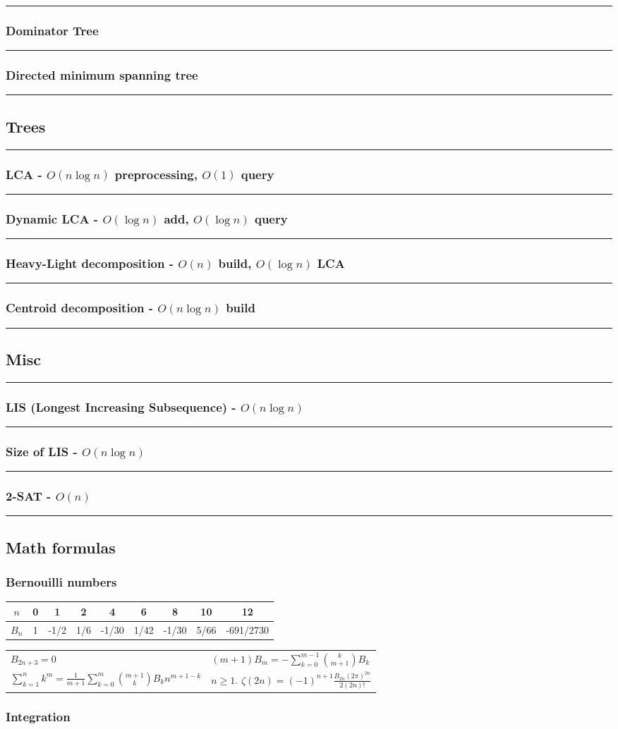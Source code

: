 \documentclass[landscape,a4paper,twocolumn,10pt]{report}
\renewcommand{\line}{\noindent\rule{\linewidth}{1pt}}
\newcommand{\algosection}[1]{\line \subsection*{#1}}
\newcommand{\algorithm}[1]{\line \subsubsection*{#1}}
\begin{document}
\algorithm{Dominator Tree}


\algorithm{Directed minimum spanning tree}


\algosection{Trees}
\label{trees}

\algorithm{LCA - $O(n \log n)$ preprocessing, $O(1)$ query}


\algorithm{Dynamic LCA - $O(\log n)$ add, $O(\log n)$ query}


\algorithm{Heavy-Light decomposition - $O(n)$ build, $O(\log n)$ LCA}


\algorithm{Centroid decomposition - $O(n \log n)$ build}



\algosection{Misc}
\label{misc}

\algorithm{LIS (Longest Increasing Subsequence) - $O(n \log n)$}


\algorithm{Size of LIS - $O(n \log n)$}


\algorithm{2-SAT - $O(n)$}


\algosection{Math formulas}
\label{mathformulas}

\subsubsection*{Bernouilli numbers}

\begin{tabular}{|c|c|c|c|c|c|c|c|c|}
\hline
$n$ & 0 & 1 & 2 & 4 & 6 & 8 & 10 & 12\\
\hline
$B_n$ & 1 & -1/2 & 1/6 & -1/30 & 1/42 & -1/30 & 5/66 & -691/2730 \\
\hline
\end{tabular}

\begin{tabular}{@{}ll@{}}
$B_{2n+3} = 0$
&
$(m+1) B_m = - \sum_{k=0}^{m-1}\binom{k}{m+1}B_k$
\\
$\sum_{k=1}^nk^m=\frac{1}{m+1}\sum_{k=0}^m\binom{m+1}{k}B_kn^{m+1-k}$
&
$n\geq 1$. $\zeta(2n) = (-1)^{n+1} \frac{B_{2n} (2\pi)^{2n}}{2(2n)!}$
\end{tabular}
\medskip

\subsubsection*{Integration}
\end{document}
